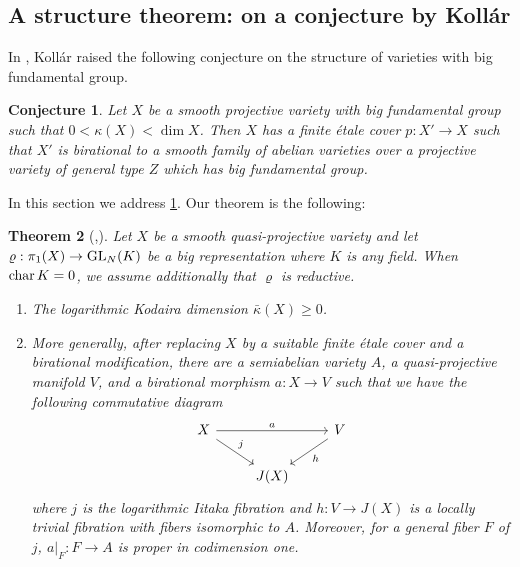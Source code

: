 \documentclass[english]{amsproc}
\theoremstyle{plain}
\newtheorem{thm}{Theorem}[section]
\newtheorem{conjecture}[thm]{Conjecture}
\theoremstyle{definition}
\theoremstyle{remark}
\theoremstyle{plain}
\numberwithin{equation}{thm} %
\newcommand{\GL}{{\rm GL}}
\begin{document}
		\subsection{A structure theorem: on a conjecture by Koll\'ar}
		In \cite[Conjecture 4.18]{Kol95}, Koll\'ar raised the following conjecture on the structure of varieties with big fundamental group. 
		\begin{conjecture}\label{conj:Kollar}
			Let $X$ be a smooth projective variety with big fundamental group such that $0<\kappa(X)<\dim X$. Then $X$ has a finite \'etale cover $p:X'\to X$ such that $X'$ is birational to a smooth family of abelian varieties over a projective variety of general type $Z$ which has big fundamental group. 
		\end{conjecture} 
		In this section we address \cref{conj:Kollar}.  Our theorem is the following:
		\begin{thm}[{\cite[Theorem 5.1]{CDY25b},\cite[Corollary H]{DY23b}}]
			\label{thm:20230510}
			Let $X$ be a   smooth quasi-projective variety and let  $\varrho:\pi_1(X)\to \GL_{N}(K)$ be a big representation where $K$ is any field.  When ${\rm char}\, K=0$, we assume additionally that $\varrho$ is reductive. 
			\begin{enumerate}[label={\rm (\alph*)}]
				\item \label{item:LKD} The logarithmic Kodaira dimension $\bar{\kappa}(X)\geq 0$. 
				\item \label{item:Iitaka}More generally, after replacing $X$ by a suitable finite \'etale cover and a birational modification, there are a semiabelian variety $A$, a quasi-projective manifold $V$, and a birational morphism $a:X\to V$ such that we have the following commutative diagram
				\begin{equation*}
					\begin{tikzcd}
						X \arrow[rr,    "a"] \arrow[dr,  "j"] & & V \arrow[ld, "h"]\\
						& J(X)&
					\end{tikzcd}
				\end{equation*}
				where $j$ is the logarithmic Iitaka fibration and $h:V\to J(X)$ is a  locally trivial fibration with fibers isomorphic to $A$.   Moreover, for a   general fiber $F$ of $j$, $a|_{F}:F\to  A$ is proper in codimension one. 
			\end{enumerate} 
		\end{thm}  
\end{document}
